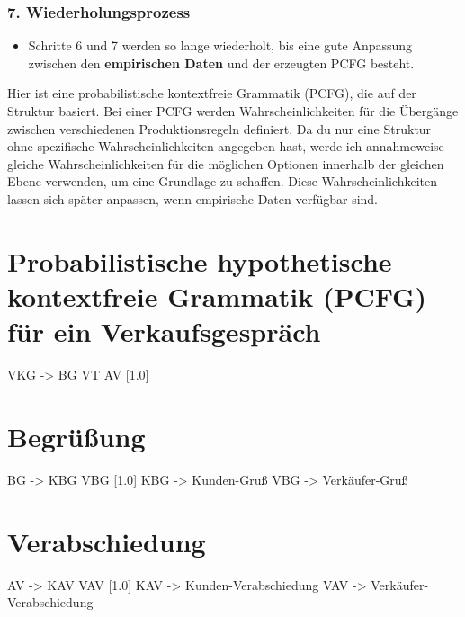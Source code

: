 \documentclass[
]{article}
\begin{document}
\subsubsection{\texorpdfstring{7.
\textbf{Wiederholungsprozess}}{7. Wiederholungsprozess}}\label{wiederholungsprozess}

\begin{itemize}
\item
  Schritte 6 und 7 werden so lange wiederholt, bis eine gute Anpassung
  zwischen den \textbf{empirischen Daten} und der erzeugten PCFG
  besteht.
\end{itemize}

Hier ist eine probabilistische kontextfreie Grammatik (PCFG), die auf
der Struktur basiert. Bei einer PCFG werden Wahrscheinlichkeiten für die
Übergänge zwischen verschiedenen Produktionsregeln definiert. Da du nur
eine Struktur ohne spezifische Wahrscheinlichkeiten angegeben hast,
werde ich annahmeweise gleiche Wahrscheinlichkeiten für die möglichen
Optionen innerhalb der gleichen Ebene verwenden, um eine Grundlage zu
schaffen. Diese Wahrscheinlichkeiten lassen sich später anpassen, wenn
empirische Daten verfügbar sind.

\section{Probabilistische hypothetische kontextfreie Grammatik (PCFG)
für ein
Verkaufsgespräch}\label{probabilistische-hypothetische-kontextfreie-grammatik-pcfg-fuxfcr-ein-verkaufsgespruxe4ch}

VKG -\textgreater{} BG VT AV {[}1.0{]}

\section{Begrüßung}\label{begruxfcuxdfung}

BG -\textgreater{} KBG VBG {[}1.0{]} KBG -\textgreater{}
\textquotesingle Kunden-Gruß\textquotesingle{} VBG -\textgreater{}
\textquotesingle Verkäufer-Gruß\textquotesingle{}

\section{Verabschiedung}\label{verabschiedung}

AV -\textgreater{} KAV VAV {[}1.0{]} KAV -\textgreater{}
\textquotesingle Kunden-Verabschiedung\textquotesingle{} VAV
-\textgreater{}
\textquotesingle Verkäufer-Verabschiedung\textquotesingle{}
\end{document}
